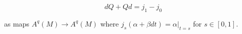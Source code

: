 $$dQ + Qd = j_1 - j_0$$

as maps $A^q(M) \rightarrow A^q(M)$ where $j_s(\alpha + \beta dt) = \alpha|_{t=s}$ for $s \in [0,1]$.
